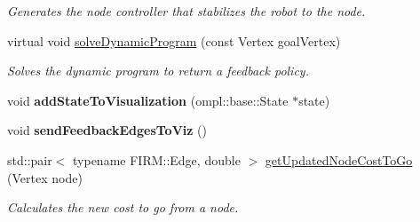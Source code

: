 \begin{DoxyCompactItemize}
\begin{DoxyCompactList}\small\item\em \-Generates the node controller that stabilizes the robot to the node. \end{DoxyCompactList}\item 
\hypertarget{class_f_i_r_m_afe1c42e65c3382e1089324c1ab6306b6}{virtual void \hyperlink{class_f_i_r_m_afe1c42e65c3382e1089324c1ab6306b6}{solve\-Dynamic\-Program} (const \-Vertex goal\-Vertex)}\label{class_f_i_r_m_afe1c42e65c3382e1089324c1ab6306b6}

\begin{DoxyCompactList}\small\item\em \-Solves the dynamic program to return a feedback policy. \end{DoxyCompactList}\item 
\hypertarget{class_f_i_r_m_a4003d4144f6c32e9eaba79f292ec9ce4}{void {\bfseries add\-State\-To\-Visualization} (ompl\-::base\-::\-State $\ast$state)}\label{class_f_i_r_m_a4003d4144f6c32e9eaba79f292ec9ce4}

\item 
\hypertarget{class_f_i_r_m_a8d9e316c11b1e2ff52b5ff65996d3a01}{void {\bfseries send\-Feedback\-Edges\-To\-Viz} ()}\label{class_f_i_r_m_a8d9e316c11b1e2ff52b5ff65996d3a01}

\item 
\hypertarget{class_f_i_r_m_a63fbfe74dd4ac52c0cb0526ab9cf63bb}{std\-::pair$<$ typename \-F\-I\-R\-M\-::\-Edge, \*
double $>$ \hyperlink{class_f_i_r_m_a63fbfe74dd4ac52c0cb0526ab9cf63bb}{get\-Updated\-Node\-Cost\-To\-Go} (\-Vertex node)}\label{class_f_i_r_m_a63fbfe74dd4ac52c0cb0526ab9cf63bb}

\begin{DoxyCompactList}\small\item\em \-Calculates the new cost to go from a node. \end{DoxyCompactList}\end{DoxyCompactItemize}
